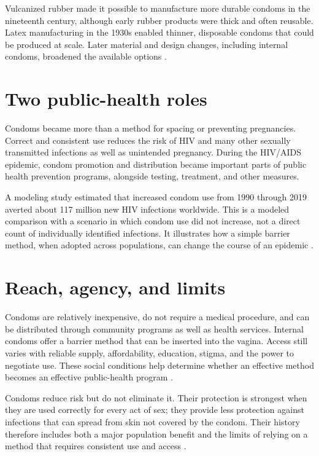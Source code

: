 \documentclass[12pt,oneside]{book}
\begin{document}
Vulcanized rubber made it possible to manufacture more durable condoms in the
nineteenth century, although early rubber products were thick and often
reusable. Latex manufacturing in the 1930s enabled thinner, disposable
condoms that could be produced at scale. Later material and design changes,
including internal condoms, broadened the available options
\cite{condomHistory,whoCondoms}.

\section{Two public-health roles}
Condoms became more than a method for spacing or preventing pregnancies.
Correct and consistent use reduces the risk of HIV and many other sexually
transmitted infections as well as unintended pregnancy. During the HIV/AIDS
epidemic, condom promotion and distribution became important parts of public
health prevention programs, alongside testing, treatment, and other measures.

A modeling study estimated that increased condom use from 1990 through 2019
averted about 117 million new HIV infections worldwide. This is a modeled
comparison with a scenario in which condom use did not increase, not a direct
count of individually identified infections. It illustrates how a simple
barrier method, when adopted across populations, can change the course of an
epidemic \cite{stoverCondomImpact,whoCondoms}.

\section{Reach, agency, and limits}
Condoms are relatively inexpensive, do not require a medical procedure, and
can be distributed through community programs as well as health services.
Internal condoms offer a barrier method that can be inserted into the vagina.
Access still varies with reliable supply, affordability, education, stigma,
and the power to negotiate use. These social conditions help determine
whether an effective method becomes an effective public-health program
\cite{whoCondoms,cdcCondoms}.

Condoms reduce risk but do not eliminate it. Their protection is strongest
when they are used correctly for every act of sex; they provide less
protection against infections that can spread from skin not covered by the
condom. Their history therefore includes both a major population benefit and
the limits of relying on a method that requires consistent use and access
\cite{whoCondoms,cdcCondoms}.
\end{document}
